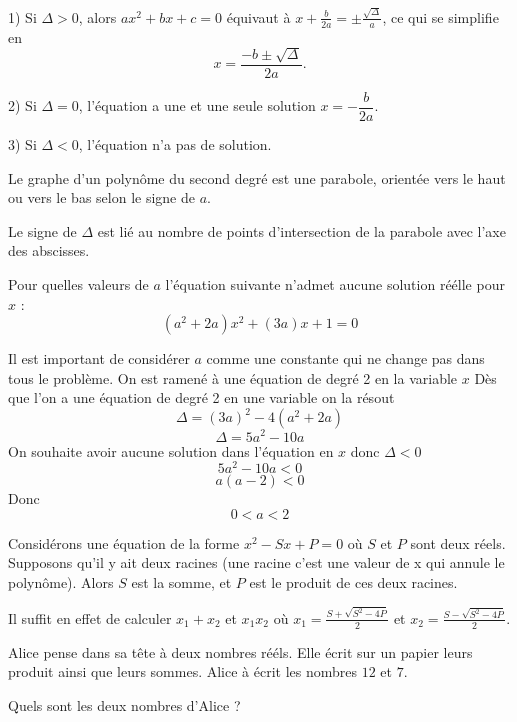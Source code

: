 1) Si $\Delta>0$, alors $ax^2+bx+c=0$ \'equivaut \`a $x+\frac{b}{2a}=\pm \frac{\sqrt{\Delta}}{a}$, ce qui se simplifie en
$$x=\frac{-b\pm\sqrt{\Delta}}{2a}.$$
\par\medskip

2) Si $\Delta=0$, l'\'equation a une et une seule solution $x=-\dfrac{b}{2a}$.
\par\medskip

3) Si $\Delta<0$, l'\'equation n'a pas de solution.
\par\medskip

Le graphe d'un polyn\^ome du second degr\'e est une parabole, orient\'ee vers le haut ou vers le bas selon le signe de $a$.

Le signe de $\Delta$ est li\'e au nombre de points d'intersection de la parabole avec l'axe des abscisses.

\begin{exo}
	Pour quelles valeurs de $a$ l'équation suivante n'admet aucune solution réélle pour $x$ : 
	$$(a^{2}+2a)x^{2}+(3a)x+1=0$$
\end{exo}
\begin{sol}
	Il est important de considérer $a$ comme une constante qui ne change pas dans tous le problème. On est ramené à une équation de degré 2 en la variable $x$
	Dès que l'on a une équation de degré 2 en une variable on la résout
	$$\Delta  = (3a)^{2}-4(a^{2}+2a)$$
	$$\Delta  =  5a^{2}-10a$$
	On souhaite avoir aucune solution dans l'équation en $x$ donc $\Delta < 0$
	$$5a^{2}-10a < 0$$
	$$a(a-2)<0$$
	Donc $$0<a<2$$
\end{sol}


\begin{prop}
 Consid\'erons une \'equation de la forme $x^2-Sx+P=0$ o\`u $S$ et $P$ sont deux r\'eels. Supposons qu'il y ait deux racines (une racine c'est une valeur de x qui annule le polynôme). Alors $S$ est la somme, et $P$ est le produit de ces deux racines.
\end{prop}

Il suffit en effet de calculer $x_1+x_2$ et $x_1x_2$ o\`u $x_1=\frac{S+\sqrt{S^2-4P}}{2}$ et $x_2=\frac{S-\sqrt{S^2-4P}}{2}$.

\begin{exo}
	Alice pense dans sa tête à deux nombres rééls.
	Elle écrit sur un papier leurs produit ainsi que leurs sommes.
	Alice à écrit les nombres $12$ et $7$.

Quels sont les deux nombres d'Alice ? 
\end{exo}


